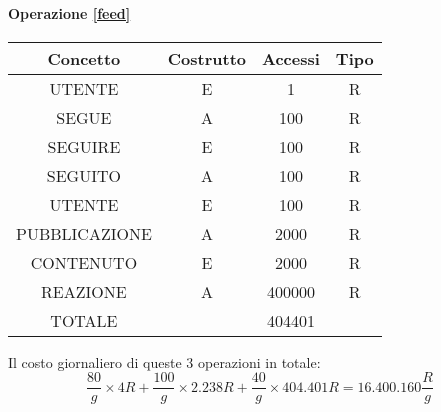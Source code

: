 \documentclass[a4paper,12pt]{report}
\begin{document}
\begin{table}[H]
\paragraph{Operazione \ref{feed}\newline}
\begin{tabular}{|c|c|c|c|}
\hline
Concetto      & Costrutto & Accessi & Tipo \\ \hline
UTENTE        & E         & 1       & R    \\ \hline
SEGUE         & A         & 100     & R    \\ \hline
SEGUIRE       & E         & 100     & R    \\ \hline
SEGUITO       & A         & 100     & R    \\ \hline
UTENTE        & E         & 100     & R    \\ \hline
PUBBLICAZIONE & A         & 2000    & R    \\ \hline
CONTENUTO     & E         & 2000    & R    \\ \hline
REAZIONE      & A         & 400000  & R    \\ \hline
TOTALE        &           & 404401  &      \\ \hline
\end{tabular}
\end{table}
Il costo giornaliero di queste 3 operazioni in totale:
\begin{equation}
  \frac{80} g \times 4 R + \frac{100} g \times 2.238 R + \frac{40} g \times 404.401 R = 16.400.160 \frac{R} g 
\end{equation}
\end{document}
